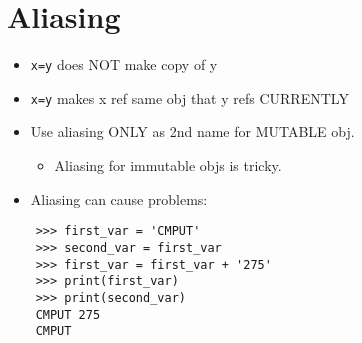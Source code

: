 \documentclass{article}
\begin{document}
\section{Aliasing}
\begin{itemize}
    \item \texttt{x=y} does NOT make copy of y
    \item \texttt{x=y} makes x ref same obj that y refs CURRENTLY
    \item Use aliasing ONLY as 2nd name for MUTABLE obj.
        \begin{itemize}
            \item Aliasing for immutable objs is tricky.
        \end{itemize}
    \item Aliasing can cause problems:
\end{itemize}
\vspace{-1em}
\begin{lstlisting}
    >>> first_var = 'CMPUT'
    >>> second_var = first_var
    >>> first_var = first_var + '275'
    >>> print(first_var)
    >>> print(second_var)
    CMPUT 275
    CMPUT
\end{lstlisting}
\end{document}
